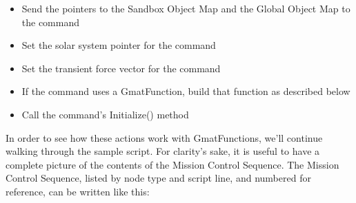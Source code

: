\begin{itemize}
\item Send the pointers to the Sandbox Object Map and the Global Object Map to the command
\item Set the solar system pointer for the command
\item Set the transient force vector for the command
\item If the command uses a GmatFunction, build that function as described below
\item Call the command's Initialize() method
\end{itemize}
\noindent In order to see how these actions work with GmatFunctions, we'll continue walking through
the sample script.  For clarity's sake, it is useful to have a complete picture of the contents of
the Mission Control Sequence.  The Mission Control Sequence, listed by node type and script line,
and numbered for reference, can be written like this:

